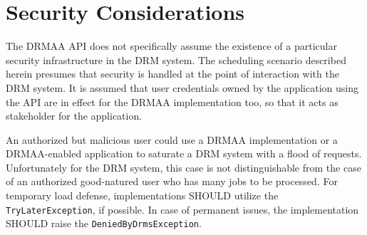 \documentclass{article}
\newcommand{\h}[1]{\lstinline|#1|}
\begin{document}





























\section{Security Considerations}
\label{sec:security}

The DRMAA API does not specifically assume the existence of a particular security infrastructure in the DRM system. The scheduling scenario described herein presumes that security is handled at the point of interaction with the DRM system. It is assumed that user credentials owned by the application using the API are in effect for the DRMAA implementation too, so that it acts as stakeholder for the application. 

An authorized but malicious user could use a DRMAA implementation or a DRMAA-enabled application to saturate a DRM system with a flood of requests. Unfortunately for the DRM system, this case is not distinguishable from the case of an authorized good-natured user who has many jobs to be processed. For temporary load defense, implementations SHOULD utilize the \h{TryLaterException}, if possible. In case of permanent issues, the implementation SHOULD raise the \h{DeniedByDrmsException}.
\end{document}
